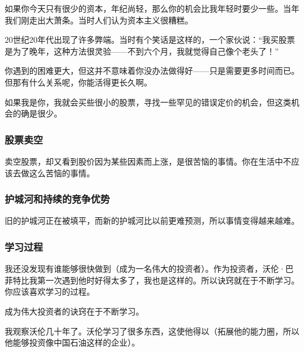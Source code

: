 如果你今天只有很少的资本，年纪尚轻，那么你的机会比我年轻时要少一些。当年我们刚走出大萧条。当时人们认为资本主义很糟糕。
\par

20世纪20年代出现了许多弊端。当时有个笑话是这样的，一个家伙说：“我买股票是为了晚年，这种方法很灵验——不到六个月，我就觉得自己像个老头了！”
\par

你遇到的困难更大，但这并不意味着你没办法做得好——只是需要更多时间而已。但那有什么关系呢，你能活得更长久啊。
\par

如果我是你，我就会买些很小的股票，寻找一些罕见的错误定价的机会，但这类机会的确是很少。
\par

\subsubsection*{股票卖空}

卖空股票，却又看到股价因为某些因素而上涨，是很苦恼的事情。你在生活中不应该去做这么苦恼的事情。
\par

\subsubsection*{护城河和持续的竞争优势}

旧的护城河正在被填平，而新的护城河比以前更难预测，所以事情变得越来越难。
\par

\subsubsection*{学习过程}

我还没发现有谁能够很快做到（成为一名伟大的投资者）。作为投资者，沃伦·巴菲特比我第一次遇到他时好得太多了，我也是这样的。所以诀窍就在于不断学习。你应该喜欢学习的过程。
\par

\begin{WisdomBox}
\par

成为伟大投资者的诀窍在于不断学习。
\par
\end{WisdomBox}

我观察沃伦几十年了。沃伦学习了很多东西，这使他得以（拓展他的能力圈，所以他能够投资像中国石油这样的企业）。
\par

